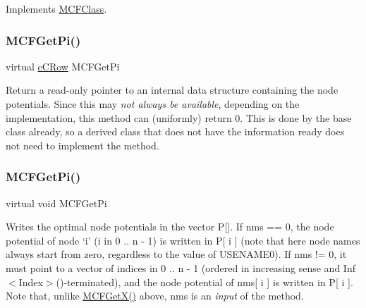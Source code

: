 Implements \mbox{\hyperlink{class_m_c_f_class_a109d7c021feda837d8ca5051fc24b6ea}{M\+C\+F\+Class}}.

\mbox{\label{class_m_c_f_cplex_a8f1a95d5c707f83ffc6aecba1e7e0e10}} 
\subsubsection{\texorpdfstring{M\+C\+F\+Get\+Pi()}{MCFGetPi()}\hspace{0.1cm}{\footnotesize\ttfamily [1/3]}}
{\footnotesize\ttfamily virtual \mbox{\hyperlink{class_m_c_f_class_ab700102e9ba8bb6015be6818d4e99097}{c\+C\+Row}} M\+C\+F\+Get\+Pi\hspace{0.3cm}{\ttfamily [inline]}}

Return a read-\/only pointer to an internal data structure containing the node potentials. Since this may {\itshape not always be available}, depending on the implementation, this method can (uniformly) return 0. This is done by the base class already, so a derived class that does not have the information ready does not need to implement the method. \mbox{\label{class_m_c_f_cplex_a8c573c04800332c86ea31aeb80bbd7b1}} 
\subsubsection{\texorpdfstring{M\+C\+F\+Get\+Pi()}{MCFGetPi()}\hspace{0.1cm}{\footnotesize\ttfamily [2/3]}}
{\footnotesize\ttfamily virtual void M\+C\+F\+Get\+Pi}

Writes the optimal node potentials in the vector P\mbox{[}\mbox{]}. If nms == 0, the node potential of node `i' (i in 0 .. n -\/ 1) is written in P\mbox{[} i \mbox{]} (note that here node names always start from zero, regardless to the value of U\+S\+E\+N\+A\+M\+E0). If nms != 0, it must point to a vector of indices in 0 .. n -\/ 1 (ordered in increasing sense and Inf$<$\+Index$>$()-\/terminated), and the node potential of nms\mbox{[} i \mbox{]} is written in P\mbox{[} i \mbox{]}. Note that, unlike \mbox{\hyperlink{class_m_c_f_class_a4eb307e0707adaef99bb0e08c9e10eb8}{M\+C\+F\+Get\+X()}} above, nms is an {\itshape input} of the method.

